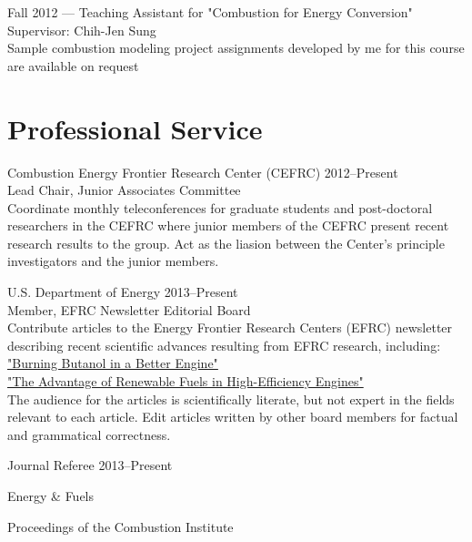 Fall 2012 --- Teaching Assistant for "Combustion for Energy Conversion"\\
Supervisor: Chih-Jen Sung\\
Sample combustion modeling project assignments developed by me for this
course are available on request

\section{{\sectionfont Professional Service}}

Combustion Energy Frontier Research Center (CEFRC) \hfill 2012--Present\\
Lead Chair, Junior Associates Committee\\
Coordinate monthly teleconferences for graduate students
and post-doctoral researchers in the CEFRC where junior members of
the CEFRC present recent research results to the group.
Act as the liasion between the Center's principle investigators
and the junior members.

\vspace{\baselineskip}

U.S. Department of Energy \hfill 2013--Present\\
Member, EFRC Newsletter Editorial Board\\
Contribute articles to the Energy Frontier Research Centers (EFRC)
newsletter describing recent scientific advances resulting from 
EFRC research, including:\\
\href{http://www.energyfrontier.us/newsletter/201210/burning-butanol-better-engine}
{"Burning Butanol in a Better Engine"}\\
\href{http://www.energyfrontier.us/newsletter/201401/advantage-renewable-fuels-high-efficiency-engines}
{"The Advantage of Renewable Fuels in High-Efficiency Engines"}\\
The audience for the articles is scientifically literate, but not
expert in the fields relevant to each article. Edit articles written 
by other board members for factual and grammatical correctness.

\vspace{\baselineskip}

Journal Referee \hfill 2013--Present
   \begin{innerlist}
       \item[] Energy \& Fuels
       \item[] Proceedings of the Combustion Institute
   \end{innerlist}


